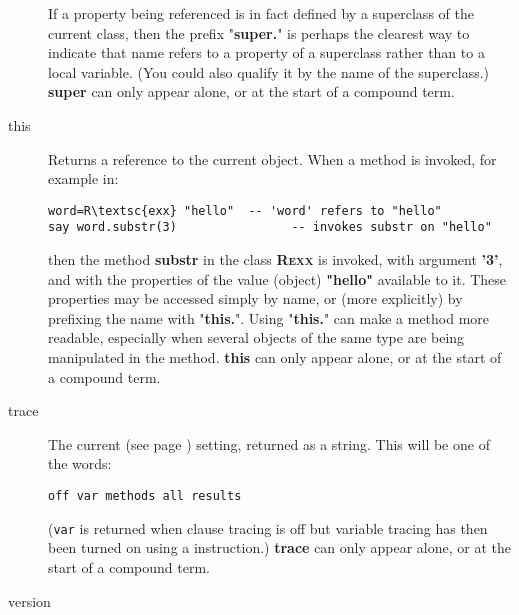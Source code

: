 \begin{description}
If a property being referenced is in fact defined by a superclass of
the current class, then the prefix "\textbf{super.}" is perhaps
the clearest way to indicate that name refers to a property of a
superclass rather than to a local variable.
(You could also qualify it by the name of the superclass.)
 \textbf{super} can only appear alone, or at the start of a
compound term.
\item[this]\label{refswthis}
 
Returns a reference to the current object.
When a method is invoked, for example in:
\begin{lstlisting}
word=R\textsc{exx} "hello"  -- 'word' refers to "hello"
say word.substr(3)                -- invokes substr on "hello"
\end{lstlisting}
then the method \textbf{substr} in the class \textbf{R\textsc{exx}} is
invoked, with argument \textbf{'3'}, and with the properties of the
value (object) \textbf{"hello"} available to it.
These properties may be accessed simply by name, or (more explicitly) by
prefixing the name with "\textbf{this.}".
Using "\textbf{this.}" can make a method more readable,
especially when several objects of the same type are being manipulated
in the method.
 \textbf{this} can only appear alone, or at the start of a
compound term.
\item[trace]\label{refswtrace}

The current   (see page \pageref{reftrace})  setting,
returned as a \nr{} string.
This will be one of the words:
\begin{lstlisting}
off var methods all results
\end{lstlisting}

(\texttt{var} is returned when clause tracing is off but variable
tracing has then been turned on using a  instruction.)
 \textbf{trace} can only appear alone, or at the start of a
compound term.
\item[version]\label{refswvers}
 

\end{description}
